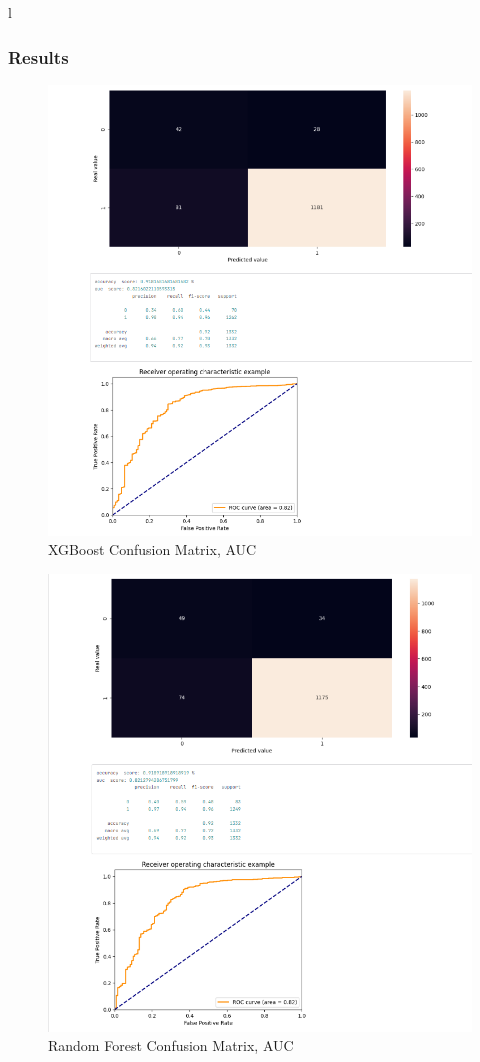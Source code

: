 l\documentclass[a4paper,12pt,twoside]{report}
\begin{document}
\subsubsection{Results}
\begin{figure}[H]
		\includegraphics[width=\textwidth]{images/xgboost}
	\caption[XGBoost Confusion Matrix, AUC]{XGBoost Confusion Matrix, AUC}
\label{xgboost}
\end{figure}
\begin{figure}[H]
		\includegraphics[width=\textwidth]{images/randomforest}
	\caption[Random Forest Confusion Matrix, AUC]{Random Forest Confusion Matrix, AUC}
\label{randomfor}
\end{figure}
\end{document}
